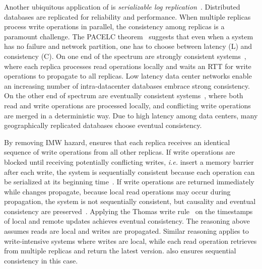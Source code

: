 Another ubiquitous application of \sys is \textit{serializable log replication}~\cite{birman1985replication,petersen1997flexible,belaramani2006practi}.
Distributed databases are replicated for reliability and performance.
When multiple replicas process write operations in parallel, the consistency among replicas is a paramount challenge.
The PACELC theorem~\cite{abadi2012consistency} suggests that even when a system has no failure and network partition, one has to choose between latency (L) and consistency (C).
On one end of the spectrum are strongly consistent systems~\cite{kallman2008h,li2012making,corbett2013spanner}, where each replica processes read operations locally and waits an RTT for write operations to propagate to all replicas.
Low latency data center networks enable an increasing number of intra-datacenter databases embrace strong consistency.
On the other end of spectrum are eventually consistent systems~\cite{terry1995managing,lloyd2011don,lloyd2013stronger}, where both read and write operations are processed locally, and conflicting write operations are merged in a deterministic way.
Due to high latency among data centers, many geographically replicated databases choose eventual consistency.


By removing IMW hazard, \sys ensures that each replica receives an identical sequence of write operations from all other replicas.
If write operations are blocked until receiving potentially conflicting writes, \textit{i.e.} insert a memory barrier after each write, the system is sequentially consistent because each operation can be serialized at its beginning time~\cite{lu2016snow}.
If write operations are returned immediately while changes propagate, because local read operations may occur during propagation, the system is not sequentially consistent, but causality and eventual consistency are preserved~\cite{terry1995managing}.
Applying the Thomas write rule~\cite{thomas1979majority} on the timestamps of local and remote updates achieves eventual consistency.
The reasoning above assumes reads are local and writes are propagated.
Similar reasoning applies to write-intensive systems where writes are local, while each read operation retrieves from multiple replicas and return the latest version.
\sys also ensures sequential consistency in this case.

